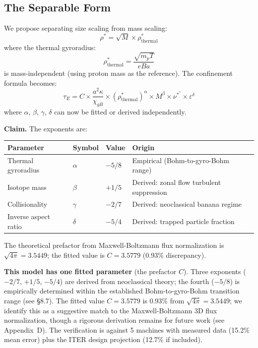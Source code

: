 \documentclass[11pt,letterpaper]{article}
\newcommand{\tauE}{\tau_E}
\newcommand{\chiGB}{\chi_{gB}}
\newcommand{\rhostar}{\rho^*}
\newcommand{\rhotherm}{\rho_{\text{thermal}}^*}
\newcommand{\nustar}{\nu^*}
\begin{document}
\subsection{The Separable Form}

We propose separating size scaling from mass scaling:
\begin{equation}
\rhostar = \sqrt{M} \times \rhotherm
\end{equation}
where the thermal gyroradius:
\begin{equation}
\rhotherm = \frac{\sqrt{m_p T}}{eBa}
\end{equation}
is mass-independent (using proton mass as the reference). The confinement formula becomes:
\begin{equation}
\tauE = C \times \frac{a^2 \kappa}{\chiGB} \times (\rhotherm)^{\alpha} \times M^{\beta} \times \nustar^{\gamma} \times \varepsilon^{\delta}
\end{equation}
where $\alpha$, $\beta$, $\gamma$, $\delta$ can now be fitted or derived independently.

\textbf{Claim.} The exponents are:

\begin{center}
\begin{tabular}{llll}
\toprule
\textbf{Parameter} & \textbf{Symbol} & \textbf{Value} & \textbf{Origin} \\
\midrule
Thermal gyroradius & $\alpha$ & $-5/8$ & Empirical (Bohm-to-gyro-Bohm range) \\
Isotope mass & $\beta$ & $+1/5$ & Derived: zonal flow turbulent suppression \\
Collisionality & $\gamma$ & $-2/7$ & Derived: neoclassical banana regime \\
Inverse aspect ratio & $\delta$ & $-5/4$ & Derived: trapped particle fraction \\
\bottomrule
\end{tabular}
\end{center}

The theoretical prefactor from Maxwell-Boltzmann flux normalization is $\sqrt{4\pi} = 3.5449$; the fitted value is $C = 3.5779$ (0.93\% discrepancy).

\textbf{This model has one fitted parameter} (the prefactor $C$). Three exponents ($-2/7$, $+1/5$, $-5/4$) are derived from neoclassical theory; the fourth ($-5/8$) is empirically determined within the established Bohm-to-gyro-Bohm transition range (see \S8.7). The fitted value $C = 3.5779$ is 0.93\% from $\sqrt{4\pi} = 3.5449$; we identify this as a suggestive match to the Maxwell-Boltzmann 3D flux normalization, though a rigorous derivation remains for future work (see Appendix~D). The verification is against 5 machines with measured data (15.2\% mean error) plus the ITER design projection (12.7\% if included).
\end{document}

